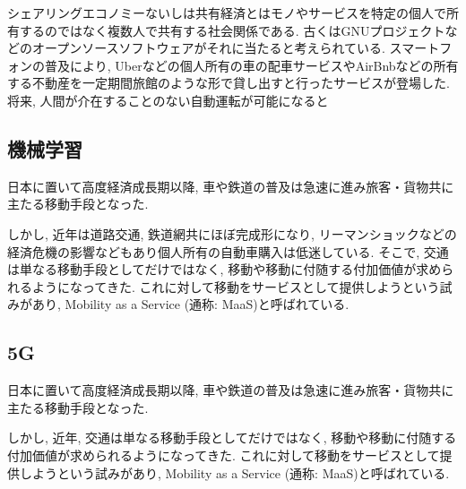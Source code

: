 シェアリングエコノミー\cite{Sharing}ないしは共有経済とはモノやサービスを特定の個人で所有するのではなく複数人で共有する社会関係である.
古くはGNUプロジェクトなどのオープンソースソフトウェアがそれに当たると考えられている.
スマートフォンの普及により, Uberなどの個人所有の車の配車サービスやAirBnbなどの所有する不動産を一定期間旅館のような形で貸し出すと行ったサービスが登場した.
将来, 人間が介在することのない自動運転が可能になると

\subsection{機械学習}

日本に置いて高度経済成長期以降, 車や鉄道の普及は急速に進み旅客・貨物共に主たる移動手段となった.

しかし, 近年は道路交通, 鉄道網共にほぼ完成形になり, リーマンショックなどの経済危機の影響などもあり個人所有の自動車購入は低迷している. そこで, 交通は単なる移動手段としてだけではなく, 移動や移動に付随する付加価値が求められるようになってきた.
これに対して移動をサービスとして提供しようという試みがあり, Mobility as a Service (通称: MaaS)と呼ばれている.


\subsection{5G}

日本に置いて高度経済成長期以降, 車や鉄道の普及は急速に進み旅客・貨物共に主たる移動手段となった.

しかし, 近年, 交通は単なる移動手段としてだけではなく, 移動や移動に付随する付加価値が求められるようになってきた.
これに対して移動をサービスとして提供しようという試みがあり, Mobility as a Service (通称: MaaS)と呼ばれている.



